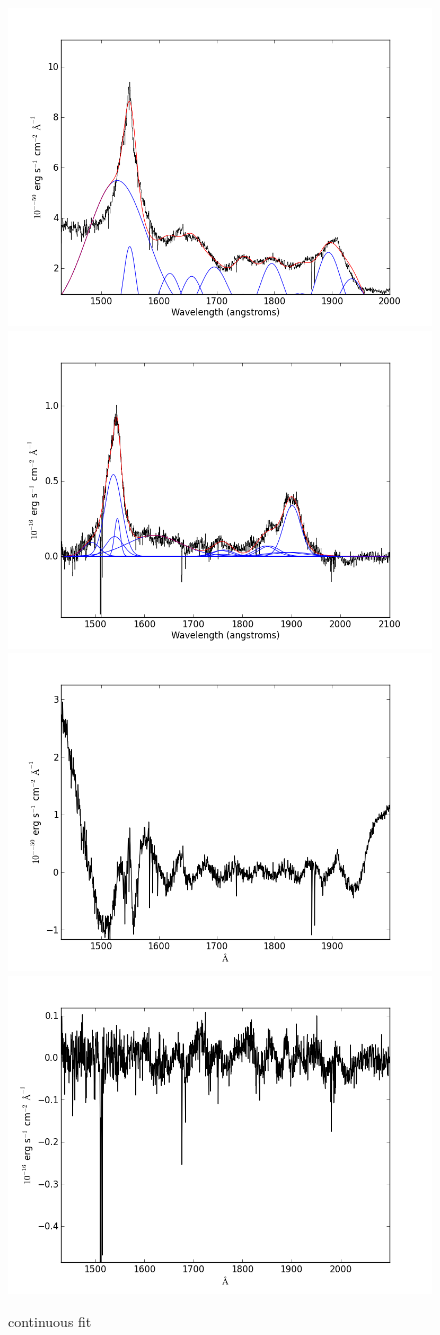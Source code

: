 \documentclass[usenatbib]{mn2e}
\begin{document}
\newpage




\begin{figure}
\begin{center}
\includegraphics[width=0.46\linewidth,angle=0]{C_12.png}
\vspace{5mm}
\includegraphics[width=0.49\linewidth,angle=0]{C_13.png}\\
\includegraphics[width=0.46\linewidth,angle=0]{C_res_12.png}
\hspace{5mm}
\includegraphics[width=0.49\linewidth,angle=0]{C_res_13.png}\\
\end{center} 
\caption{continuous fit \label{fig:landscape}}   
\end{figure}
\end{document}
